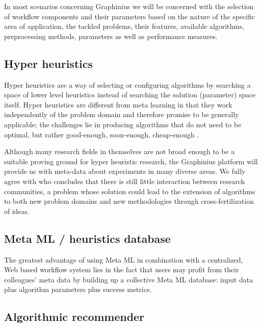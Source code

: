 In most scenarios concerning Graphinius we will be concerned with the selection of workflow components and their parameters based on the nature of the specific area of application, the tackled problems, their features, available algorithms, preprocessing methods, parameters as well as performance measures.

\subsection{Hyper heuristics}
\label{ssect:hyper_heuristics}

Hyper heuristics are a way of selecting or configuring algorithms by searching a space of lower level heuristics instead of searching the solution (parameter) space itself. Hyper heuristics are different from meta learning in that they work independently of the problem domain and therefore promise to be generally applicable; the challenges lie in producing algorithms that do not need to be optimal, but rather good-enough, soon-enough, cheap-enough \citep{Burke:2003:Hyperheuristics}.

Although many research fields in themselves are not broad enough to be a suitable proving ground for hyper heuristic research, the Graphinius platform will provide us with meta-data about experiments in many diverse areas. We fully agree with \cite{Burke2013} who concludes that there is still little interaction between research communities, a problem whose solution could lead to the extension of algorithms to both new problem domains and new methodologies through cross-fertilization of ideas.


\subsection{Meta ML / heuristics database}
\label{ssect:heuristics}

The greatest advantage of using Meta ML in combination with a centralized, Web based workflow system lies in the fact that users may profit from their colleagues' meta data by building up a collective Meta ML database: input data plus algorithm parameters plus success metrics.


\subsection{Algorithmic recommender}
\label{ssect:algo_recommender}
